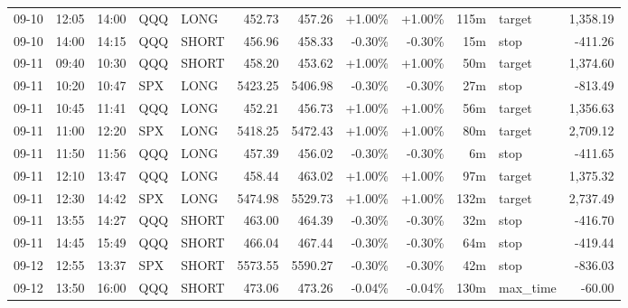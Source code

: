 \documentclass[11pt,a4paper,twoside]{article}
\begin{document}
\begin{center}
\begin{longtable}{>{\color{txtmain}}l l l l l r r r r r >{\color{txtmain}}l r}
09-10 & 12:05 & 14:00 & QQQ & LONG & 452.73 & 457.26 & \textcolor{wingreen}{+1.00\%} & \textcolor{wingreen}{+1.00\%} & 115m & target & \textcolor{wingreen}{1,358.19} \\
09-10 & 14:00 & 14:15 & QQQ & SHORT & 456.96 & 458.33 & \textcolor{lossred}{-0.30\%} & \textcolor{lossred}{-0.30\%} & 15m & stop & \textcolor{lossred}{-411.26} \\
09-11 & 09:40 & 10:30 & QQQ & SHORT & 458.20 & 453.62 & \textcolor{wingreen}{+1.00\%} & \textcolor{wingreen}{+1.00\%} & 50m & target & \textcolor{wingreen}{1,374.60} \\
09-11 & 10:20 & 10:47 & SPX & LONG & 5423.25 & 5406.98 & \textcolor{lossred}{-0.30\%} & \textcolor{lossred}{-0.30\%} & 27m & stop & \textcolor{lossred}{-813.49} \\
09-11 & 10:45 & 11:41 & QQQ & LONG & 452.21 & 456.73 & \textcolor{wingreen}{+1.00\%} & \textcolor{wingreen}{+1.00\%} & 56m & target & \textcolor{wingreen}{1,356.63} \\
09-11 & 11:00 & 12:20 & SPX & LONG & 5418.25 & 5472.43 & \textcolor{wingreen}{+1.00\%} & \textcolor{wingreen}{+1.00\%} & 80m & target & \textcolor{wingreen}{2,709.12} \\
09-11 & 11:50 & 11:56 & QQQ & LONG & 457.39 & 456.02 & \textcolor{lossred}{-0.30\%} & \textcolor{lossred}{-0.30\%} & 6m & stop & \textcolor{lossred}{-411.65} \\
09-11 & 12:10 & 13:47 & QQQ & LONG & 458.44 & 463.02 & \textcolor{wingreen}{+1.00\%} & \textcolor{wingreen}{+1.00\%} & 97m & target & \textcolor{wingreen}{1,375.32} \\
09-11 & 12:30 & 14:42 & SPX & LONG & 5474.98 & 5529.73 & \textcolor{wingreen}{+1.00\%} & \textcolor{wingreen}{+1.00\%} & 132m & target & \textcolor{wingreen}{2,737.49} \\
09-11 & 13:55 & 14:27 & QQQ & SHORT & 463.00 & 464.39 & \textcolor{lossred}{-0.30\%} & \textcolor{lossred}{-0.30\%} & 32m & stop & \textcolor{lossred}{-416.70} \\
09-11 & 14:45 & 15:49 & QQQ & SHORT & 466.04 & 467.44 & \textcolor{lossred}{-0.30\%} & \textcolor{lossred}{-0.30\%} & 64m & stop & \textcolor{lossred}{-419.44} \\
09-12 & 12:55 & 13:37 & SPX & SHORT & 5573.55 & 5590.27 & \textcolor{lossred}{-0.30\%} & \textcolor{lossred}{-0.30\%} & 42m & stop & \textcolor{lossred}{-836.03} \\
09-12 & 13:50 & 16:00 & QQQ & SHORT & 473.06 & 473.26 & \textcolor{lossred}{-0.04\%} & \textcolor{lossred}{-0.04\%} & 130m & max\_time & \textcolor{lossred}{-60.00} \\

\end{longtable}
\end{center}
\end{document}
